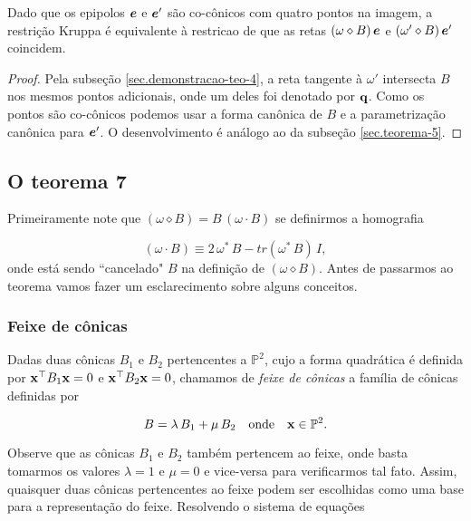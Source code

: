 \begin{teorema}
Dado que os epipolos $\boldsymbol{e}$ e $\boldsymbol{e}'$ são co-cônicos com quatro pontos na imagem, a restrição Kruppa é equivalente à restricao de que as retas $(\omega\diamond B)\,\boldsymbol{e}$ e $(\omega'\diamond B)\,\boldsymbol{e}'$ coincidem.
\end{teorema}

\begin{proof}
Pela subseção \ref{sec.demonstracao-teo-4}, a reta tangente à $\omega'$ intersecta $B$ nos mesmos pontos adicionais, onde um deles foi denotado por ${\bf q}$. Como os pontos são co-cônicos podemos usar a forma canônica de $B$ e a parametrização canônica para $\boldsymbol{e}'$. O desenvolvimento é análogo ao da subseção \ref{sec.teorema-5}.
\end{proof}

\subsection{O teorema 7}


Primeiramente note que $(\omega \diamond B) = B\,(\omega \cdot B)$ se definirmos a homografia

\begin{equation}
(\omega \cdot B) \equiv 2\,\omega^*\,B - tr(\omega^*\,B)\,I,
\end{equation}
onde está sendo ``cancelado" $B$ na definição de $(\omega \diamond B)$. Antes de passarmos ao teorema vamos fazer um esclarecimento sobre alguns conceitos. 

\subsubsection{Feixe de cônicas}\label{sec.feixe-conicas}

Dadas duas cônicas $B_1$ e $B_2$ pertencentes a $\mathbb{P}^2$, cujo a forma quadrática é definida por $\mathbf{x}^\top B_1\mathbf{x}=0$ e $\mathbf{x}^\top B_2\mathbf{x}=0$, chamamos de \textit{feixe de cônicas} a família de cônicas definidas por

\begin{equation}\label{eq.B-combinacao-B1-B2}
B=\lambda\,B_1+\mu\,B_2\quad\text{onde}\quad\mathbf{x}\in\mathbb{P}^2.
\end{equation}

Observe que as cônicas $B_1$ e $B_2$ também pertencem ao feixe, onde basta tomarmos os valores $\lambda=1$ e $\mu=0$ e vice-versa para verificarmos tal fato. Assim, quaisquer duas cônicas pertencentes ao feixe podem ser escolhidas como uma base para a representação do feixe. Resolvendo o sistema de equações

